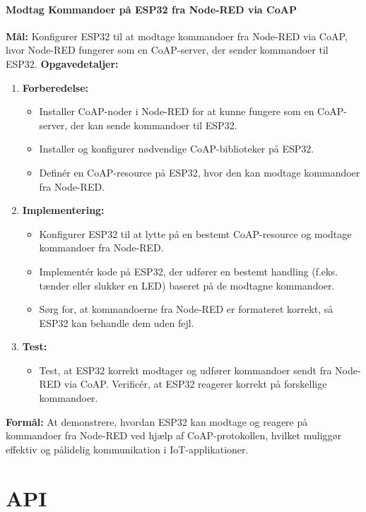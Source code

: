 \documentclass[12pt,a4paper]{book}
\begin{document}
	\subsection*{Modtag Kommandoer på ESP32 fra Node-RED via CoAP}
	\textbf{Mål:} Konfigurer ESP32 til at modtage kommandoer fra Node-RED via CoAP, hvor Node-RED fungerer som en CoAP-server, der sender kommandoer til ESP32.
	\newline\newline\noindent
	\textbf{Opgavedetaljer:}
	\begin{enumerate}
		\item \textbf{Forberedelse:}
		\begin{itemize}
			\item Installer CoAP-noder i Node-RED for at kunne fungere som en CoAP-server, der kan sende kommandoer til ESP32.
			\item Installer og konfigurer nødvendige CoAP-biblioteker på ESP32.
			\item Definér en CoAP-resource på ESP32, hvor den kan modtage kommandoer fra Node-RED.
		\end{itemize}
		\item \textbf{Implementering:}
		\begin{itemize}
			\item Konfigurer ESP32 til at lytte på en bestemt CoAP-resource og modtage kommandoer fra Node-RED.
			\item Implementér kode på ESP32, der udfører en bestemt handling (f.eks. tænder eller slukker en LED) baseret på de modtagne kommandoer.
			\item Sørg for, at kommandoerne fra Node-RED er formateret korrekt, så ESP32 kan behandle dem uden fejl.
		\end{itemize}
		\item \textbf{Test:}
		\begin{itemize}
			\item Test, at ESP32 korrekt modtager og udfører kommandoer sendt fra Node-RED via CoAP. Verificér, at ESP32 reagerer korrekt på forskellige kommandoer.
		\end{itemize}
	\end{enumerate}
	\textbf{Formål:} At demonstrere, hvordan ESP32 kan modtage og reagere på kommandoer fra Node-RED ved hjælp af CoAP-protokollen, hvilket muliggør effektiv og pålidelig kommunikation i IoT-applikationer.
	
	\part{API}
\end{document}
